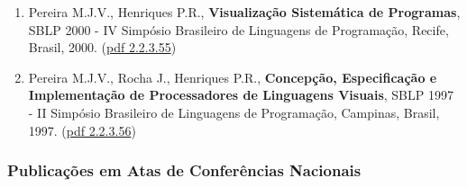 \documentclass[11pt]{article}
\begin{document}
\begin{enumerate}
\item {Pereira M.J.V., Henriques P.R., {\bf{ Visualização Sistemática de Programas}}, SBLP 2000 - IV Simpósio Brasileiro de Linguagens de Programação, Recife, Brasil, 2000. (\href{run:Publicacoes/publicacoes/4.pdf}{pdf 2.2.3.55})}
\item {Pereira M.J.V., Rocha J., Henriques P.R., {\bf{ Concepção, Especificação e Implementação de Processadores de Linguagens Visuais}}, SBLP 1997 - II Simpósio Brasileiro de Linguagens de Programação, Campinas, Brasil, 1997. (\href{run:Publicacoes/publicacoes/2.pdf}{pdf 2.2.3.56})}
\end{enumerate} 

\subsubsection{Publicações em Atas de Conferências Nacionais}
\end{document}
